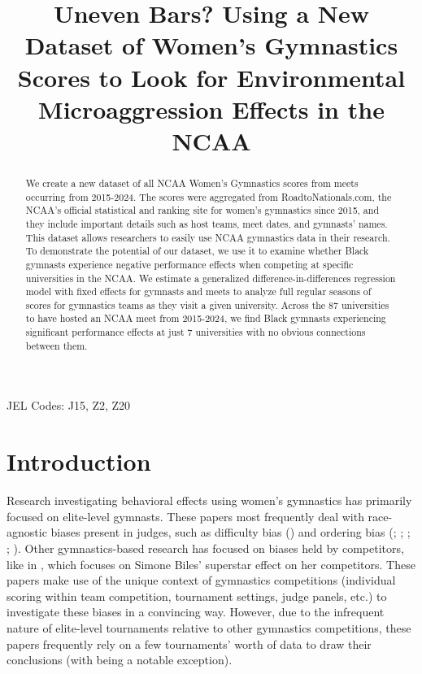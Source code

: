 \documentclass[12pt]{article}
\title{Uneven Bars? Using a New Dataset of Women's Gymnastics Scores to Look for Environmental Microaggression Effects in the NCAA}
\begin{document}
\maketitle
\thispagestyle{empty} 

\begin{abstract}
We create a new dataset of all NCAA Women's Gymnastics scores from meets occurring from 2015-2024. The scores were aggregated from RoadtoNationals.com, the NCAA's official statistical and ranking site for women's gymnastics since 2015, and they include important details such as host teams, meet dates, and gymnasts' names. This dataset allows researchers to easily use NCAA gymnastics data in their research. To demonstrate the potential of our dataset, we use it to examine whether Black gymnasts experience negative performance effects when competing at specific universities in the NCAA. We estimate a generalized difference-in-differences regression model with fixed effects for gymnasts and meets to analyze full regular seasons of scores for gymnastics teams as they visit a given university. Across the 87 universities to have hosted an NCAA meet from 2015-2024, we find Black gymnasts experiencing significant performance effects at just 7 universities with no obvious connections between them.


\end{abstract}

JEL Codes: J15, Z2, Z20

\pagebreak

\setcounter{page}{1}


\section{Introduction}

Research investigating behavioral effects using women’s gymnastics has primarily focused on elite-level gymnasts. These papers most frequently deal with race-agnostic biases present in judges, such as difficulty bias (\citealp{rotthoff_2020}) and ordering bias (\citealp{damisch_mussweiler_plessner_2006}; \citealp{morgan_rotthoff_2014}; \citealp{rotthoff_2015}; \citealp{joustra_koning_krumer_2020}; \citealp{rotthoff_2020}). Other gymnastics-based research has focused on biases held by competitors, like in \cite{meissner_rai_rotthoff_2021}, which focuses on Simone Biles’ superstar effect on her competitors. These papers make use of the unique context of gymnastics competitions (individual scoring within team competition, tournament settings, judge panels, etc.) to investigate these biases in a convincing way. However, due to the infrequent nature of elite-level tournaments relative to other gymnastics competitions, these papers frequently rely on a few tournaments' worth of data to draw their conclusions (with \cite{meissner_rai_rotthoff_2021} being a notable exception).
\end{document}

